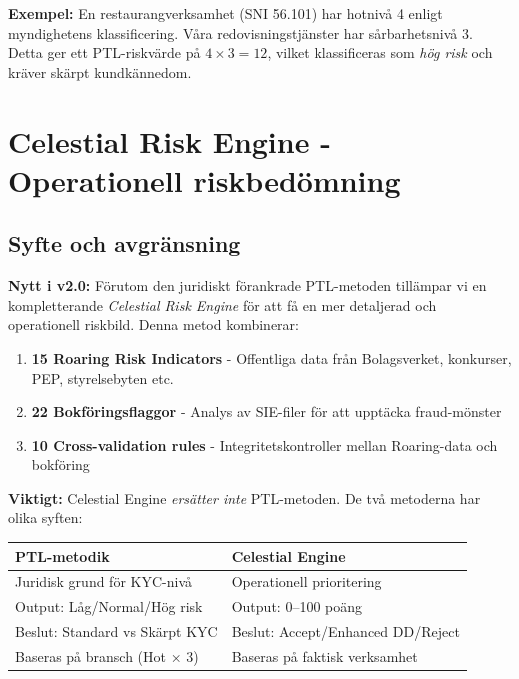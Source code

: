 \documentclass{article}
\begin{document}
\begin{tcolorbox}
\textbf{Exempel:} En restaurangverksamhet (SNI 56.101) har hotnivå 4 enligt myndighetens klassificering. Våra redovisningstjänster har sårbarhetsnivå 3. Detta ger ett PTL-riskvärde på \(4 \times 3 = 12\), vilket klassificeras som \textit{hög risk} och kräver skärpt kundkännedom.
\end{tcolorbox}

\newpage
\section*{Celestial Risk Engine - Operationell riskbedömning}

\subsection*{Syfte och avgränsning}

\textbf{Nytt i v2.0:} Förutom den juridiskt förankrade PTL-metoden tillämpar vi en kompletterande \textit{Celestial Risk Engine} för att få en mer detaljerad och operationell riskbild. Denna metod kombinerar:

\begin{enumerate}
\item \textbf{15 Roaring Risk Indicators} - Offentliga data från Bolagsverket, konkurser, PEP, styrelsebyten etc.
\item \textbf{22 Bokföringsflaggor} - Analys av SIE-filer för att upptäcka fraud-mönster
\item \textbf{10 Cross-validation rules} - Integritetskontroller mellan Roaring-data och bokföring
\end{enumerate}

\textbf{Viktigt:} Celestial Engine \textit{ersätter inte} PTL-metoden. De två metoderna har olika syften:

\begin{center}
\begin{tabular}{|p{6cm}|p{6cm}|}
\hline
\textbf{PTL-metodik} & \textbf{Celestial Engine} \\
\hline
Juridisk grund för KYC-nivå & Operationell prioritering \\
Output: Låg/Normal/Hög risk & Output: 0--100 poäng \\
Beslut: Standard vs Skärpt KYC & Beslut: Accept/Enhanced DD/Reject \\
Baseras på bransch (Hot × 3) & Baseras på faktisk verksamhet \\
\hline
\end{tabular}
\end{center}
\end{document}
